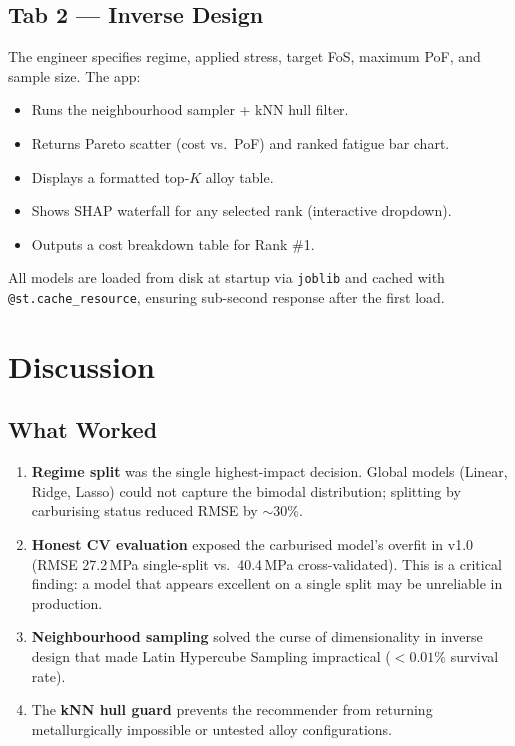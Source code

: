 \documentclass[12pt,a4paper]{article}
\begin{document}
\subsection{Tab 2 — Inverse Design}

The engineer specifies regime, applied stress, target FoS, maximum PoF, and sample size. The app:
\begin{itemize}[nosep]
  \item Runs the neighbourhood sampler + kNN hull filter.
  \item Returns Pareto scatter (cost vs.\ PoF) and ranked fatigue bar chart.
  \item Displays a formatted top-$K$ alloy table.
  \item Shows SHAP waterfall for any selected rank (interactive dropdown).
  \item Outputs a cost breakdown table for Rank \#1.
\end{itemize}

All models are loaded from disk at startup via \texttt{joblib} and cached with
\texttt{@st.cache\_resource}, ensuring sub-second response after the first load.


\section{Discussion}

\subsection{What Worked}

\begin{enumerate}[nosep]
  \item \textbf{Regime split} was the single highest-impact decision. Global models (Linear,
        Ridge, Lasso) could not capture the bimodal distribution; splitting by carburising status
        reduced RMSE by $\sim$30\%.
  \item \textbf{Honest CV evaluation} exposed the carburised model's overfit in v1.0 (RMSE
        27.2\,MPa single-split vs.\ 40.4\,MPa cross-validated). This is a critical finding: a
        model that appears excellent on a single split may be unreliable in production.
  \item \textbf{Neighbourhood sampling} solved the curse of dimensionality in inverse design that
        made Latin Hypercube Sampling impractical ($<0.01\%$ survival rate).
  \item The \textbf{kNN hull guard} prevents the recommender from returning metallurgically
        impossible or untested alloy configurations.
\end{enumerate}
\end{document}
